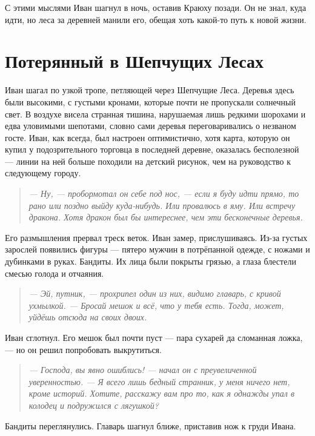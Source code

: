 \documentclass[12pt,a4paper]{book}
\newenvironment{dialogue}{\begin{quote}\itshape}{\end{quote}} %
\begin{document}
С этими мыслями Иван шагнул в ночь, оставив Краюху позади. Он не знал, куда идти, но леса за деревней манили его, обещая хоть какой-то путь к новой жизни.

\chapter{Потерянный в Шепчущих Лесах}

Иван шагал по узкой тропе, петляющей через Шепчущие Леса. Деревья здесь были высокими, с густыми кронами, которые почти не пропускали солнечный свет. В воздухе висела странная тишина, нарушаемая лишь редкими шорохами и едва уловимыми шепотами, словно сами деревья переговаривались о незваном госте. Иван, как всегда, был настроен оптимистично, хотя карта, которую он купил у подозрительного торговца в последней деревне, оказалась бесполезной --- линии на ней больше походили на детский рисунок, чем на руководство к следующему городу.

\begin{dialogue}
--- Ну, --- пробормотал он себе под нос, --- если я буду идти прямо, то рано или поздно выйду куда-нибудь. Или провалюсь в яму. Или встречу дракона. Хотя дракон был бы интереснее, чем эти бесконечные деревья.
\end{dialogue}

Его размышления прервал треск веток. Иван замер, прислушиваясь. Из-за густых зарослей появились фигуры --- пятеро мужчин в потрёпанной одежде, с ножами и дубинками в руках. Бандиты. Их лица были покрыты грязью, а глаза блестели смесью голода и отчаяния.

\begin{dialogue}
--- Эй, путник, --- прохрипел один из них, видимо главарь, с кривой ухмылкой. --- Бросай мешок и всё, что у тебя есть. Тогда, может, уйдёшь отсюда на своих двоих.
\end{dialogue}

Иван сглотнул. Его мешок был почти пуст --- пара сухарей да сломанная ложка, --- но он решил попробовать выкрутиться.

\begin{dialogue}
--- Господа, вы явно ошиблись! --- начал он с преувеличенной уверенностью. --- Я всего лишь бедный странник, у меня ничего нет, кроме историй. Хотите, расскажу вам про то, как я однажды упал в колодец и подружился с лягушкой?
\end{dialogue}

Бандиты переглянулись. Главарь шагнул ближе, приставив нож к груди Ивана.
\end{document}
